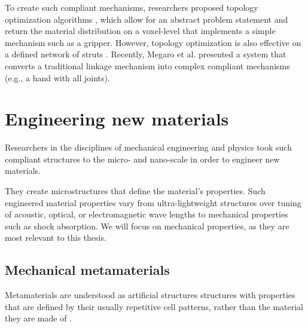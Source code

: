 {To create such compliant mechanisms, researchers proposed topology optimization algorithms \cite{Sigmund1997a, Zhu2013, Zhu2014}, which allow for an abstract problem statement and return the material distribution on a voxel-level that implements a simple mechanism such as a gripper. However, topology optimization is also effective on a defined network of struts \cite{Mankame2004, Mankame2006, Saxena2005}. Recently, Megaro et al. \cite{Megaro2017} presented a system that converts a traditional linkage mechanism into complex compliant mechanisms (e.g., a hand with all joints).










\section{Engineering new materials}

Researchers in the disciplines of mechanical engineering and physics took such compliant structures to the micro- and nano-scale in order to engineer new materials. 



They create microstructures that define the material's properties. Such engineered material properties vary from ultra-lightweight structures over tuning of acoustic, optical, or electromagnetic wave lengths to mechanical properties such as shock absorption. We will focus on mechanical properties, as they are most relevant to this thesis. 

\subsection{Mechanical metamaterials}
Metamaterials are understood as artificial structures structures with properties that are defined by their usually repetitive cell patterns, rather than the material they are made of \cite{Bertoldi2017, Christensen2015, Paulose2015}.  

}
